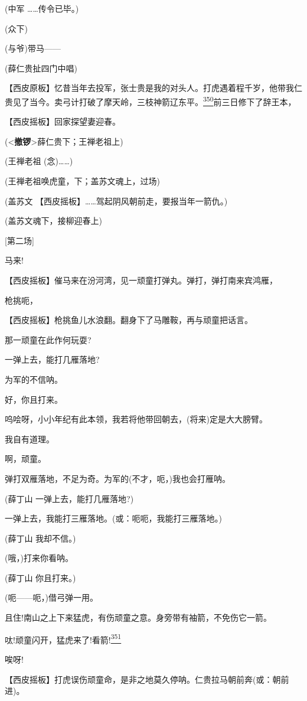 (中军 \ldots{}\ldots{}传令已毕。)

(众下)

(与爷)带马------

(薛仁贵扯四门中唱)

【西皮原板】忆昔当年去投军，张士贵是我的对头人。打虎遇着程千岁，他带我仁贵见了当今。卖弓计打破了摩天岭，三枝神箭辽东平。\protect\hyperlink{fn350}{\textsuperscript{350}}前三日修下了辞王本，

【西皮摇板】回家探望妻迎春。

(\textless{}\textbf{撤锣}\textgreater{}薛仁贵下；王禅老祖上)

(王禅老祖 (念)\ldots{}\ldots{})

(王禅老祖唤虎童，下；盖苏文魂上，过场)

(盖苏文 【西皮摇板】\ldots{}\ldots{}驾起阴风朝前走，要报当年一箭仇。)

(盖苏文魂下，接柳迎春上)

{[}第二场{]}

马来!

【西皮摇板】催马来在汾河湾，见一顽童打弹丸。弹打，弹打南来宾鸿雁，

枪挑呃，

【西皮摇板】枪挑鱼儿水浪翻。翻身下了马雕鞍，再与顽童把话言。

那一顽童在此作何玩耍?

一弹上去，能打几雁落地?

为军的不信呐。

好，你且打来。

呜哙呀，小小年纪有此本领，我若将他带回朝去，(将来)定是大大膀臂。

我自有道理。

啊，顽童。

弹打双雁落地，不足为奇。为军的(不才，呃，)我也会打雁呐。

(薛丁山 一弹上去，能打几雁落地?)

一弹上去，我能打三雁落地。(或：呃呃，我能打三雁落地。)

(薛丁山 我却不信。)

(哦，)打来你看呐。

(薛丁山 你且打来。)

(呃------呃，)借弓弹一用。

且住!南山之上下来猛虎，有伤顽童之意。身旁带有袖箭，不免伤它一箭。

呔!顽童闪开，猛虎来了!看箭!\protect\hyperlink{fn351}{\textsuperscript{351}}

唉呀!

【西皮摇板】打虎误伤顽童命，是非之地莫久停呐。仁贵拉马朝前奔(或：朝前进)。

